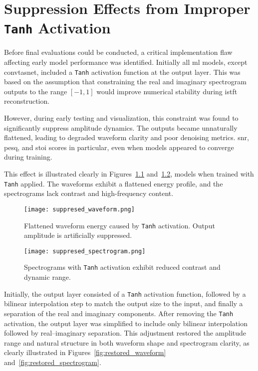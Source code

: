 \graphicspath{{content/appendices/figures}}
\chapter{Suppression Effects from Improper \texttt{Tanh} Activation}
\label{appendix:tanh_removal}

Before final evaluations could be conducted, a critical implementation flaw affecting early model performance was identified. Initially all \gls{ml} models, except \gls{convtasnet}, included a \texttt{Tanh} activation function at the output layer. This was based on the assumption that constraining the real and imaginary spectrogram outputs to the range \([-1, 1]\) would improve numerical stability during \gls{istft} reconstruction.

However, during early testing and visualization, this constraint was found to significantly suppress amplitude dynamics. The outputs became unnaturally flattened, leading to degraded waveform clarity and poor denoising metrics. \gls{snr}, \gls{pesq}, and \gls{stoi} scores in particular, even when models appeared to converge during training.

This effect is illustrated clearly in Figures~\ref{fig:suppresed_waveform} and~\ref{fig:suppresed_spectrogram}, models when trained with \texttt{Tanh} applied. The waveforms exhibit a flattened energy profile, and the spectrograms lack contrast and high-frequency content.

\begin{figure}[H]
    \centering
    \texttt{[image: suppresed\_waveform.png]}
    \caption{\label{fig:suppresed_waveform} Flattened waveform energy caused by \texttt{Tanh} activation. Output amplitude is artificially suppressed.}
\end{figure}

\begin{figure}[H]
    \centering
    \texttt{[image: suppresed\_spectrogram.png]}
    \caption{\label{fig:suppresed_spectrogram} Spectrograms with \texttt{Tanh} activation exhibit reduced contrast and dynamic range.}
\end{figure}

Initially, the output layer consisted of a \texttt{Tanh} activation function, followed by a bilinear interpolation step to match the output size to the input, and finally a separation of the real and imaginary components. After removing the \texttt{Tanh} activation, the output layer was simplified to include only bilinear interpolation followed by real–imaginary separation. This adjustment restored the amplitude range and natural structure in both waveform shape and spectrogram clarity, as clearly illustrated in Figures~\ref{fig:restored_waveform} and~\ref{fig:restored_spectrogram}.


